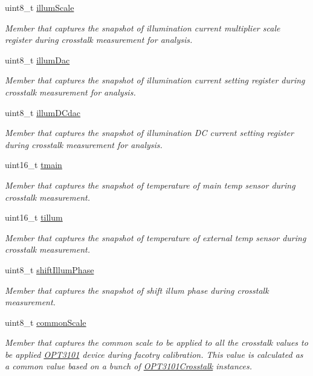 \begin{DoxyCompactItemize}
uint8\+\_\+t \mbox{\hyperlink{class_o_p_t3101_crosstalk_a72a555c338dc5ee04b513c2165afa08f}{illum\+Scale}}
\begin{DoxyCompactList}\small\item\em Member that captures the snapshot of illumination current multiplier scale register during crosstalk measurement for analysis. \end{DoxyCompactList}\item 
uint8\+\_\+t \mbox{\hyperlink{class_o_p_t3101_crosstalk_a2f1b619763f8f5ea6d15a478b8eae4fa}{illum\+Dac}}
\begin{DoxyCompactList}\small\item\em Member that captures the snapshot of illumination current setting register during crosstalk measurement for analysis. \end{DoxyCompactList}\item 
uint8\+\_\+t \mbox{\hyperlink{class_o_p_t3101_crosstalk_ac7f795c6099ada30df153141f08e3961}{illum\+D\+Cdac}}
\begin{DoxyCompactList}\small\item\em Member that captures the snapshot of illumination DC current setting register during crosstalk measurement for analysis. \end{DoxyCompactList}\item 
uint16\+\_\+t \mbox{\hyperlink{class_o_p_t3101_crosstalk_af5ac7c2a662a32e1ad954412a3c8d6ea}{tmain}}
\begin{DoxyCompactList}\small\item\em Member that captures the snapshot of temperature of main temp sensor during crosstalk measurement. \end{DoxyCompactList}\item 
uint16\+\_\+t \mbox{\hyperlink{class_o_p_t3101_crosstalk_a88191108ac32b8cc9a25309ff5beae08}{tillum}}
\begin{DoxyCompactList}\small\item\em Member that captures the snapshot of temperature of external temp sensor during crosstalk measurement. \end{DoxyCompactList}\item 
uint8\+\_\+t \mbox{\hyperlink{class_o_p_t3101_crosstalk_a48d662e8b0e764481e3aceb04ee857b0}{shift\+Illum\+Phase}}
\begin{DoxyCompactList}\small\item\em Member that captures the snapshot of shift illum phase during crosstalk measurement. \end{DoxyCompactList}\item 
uint8\+\_\+t \mbox{\hyperlink{class_o_p_t3101_crosstalk_a431124b7eed113a2969971ebec49a3a0}{common\+Scale}}
\begin{DoxyCompactList}\small\item\em Member that captures the common scale to be applied to all the crosstalk values to be applied \mbox{\hyperlink{namespace_o_p_t3101}{O\+P\+T3101}} device during facotry calibration. This value is calculated as a common value based on a bunch of \mbox{\hyperlink{class_o_p_t3101_crosstalk}{O\+P\+T3101\+Crosstalk}} instances. \end{DoxyCompactList}\end{DoxyCompactItemize}


